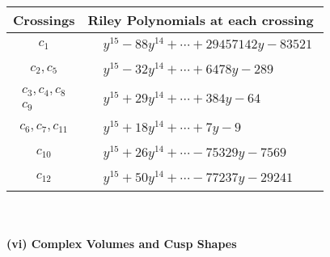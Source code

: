 \documentclass[1p]{elsarticle_modified}
\theoremstyle{definition}
\begin{document}
\begin{tabular}{m{50pt}|m{274pt}}
Crossings & \hspace{64pt}Riley Polynomials at each crossing \\
\hline $$\begin{aligned}c_{1}\end{aligned}$$&$\begin{aligned}
&y^{15}-88 y^{14}+\cdots+29457142 y-83521
\end{aligned}$\\
\hline $$\begin{aligned}c_{2},c_{5}\end{aligned}$$&$\begin{aligned}
&y^{15}-32 y^{14}+\cdots+6478 y-289
\end{aligned}$\\
\hline $$\begin{aligned}c_{3},c_{4},c_{8}\\c_{9}\end{aligned}$$&$\begin{aligned}
&y^{15}+29 y^{14}+\cdots+384 y-64
\end{aligned}$\\
\hline $$\begin{aligned}c_{6},c_{7},c_{11}\end{aligned}$$&$\begin{aligned}
&y^{15}+18 y^{14}+\cdots+7 y-9
\end{aligned}$\\
\hline $$\begin{aligned}c_{10}\end{aligned}$$&$\begin{aligned}
&y^{15}+26 y^{14}+\cdots-75329 y-7569
\end{aligned}$\\
\hline $$\begin{aligned}c_{12}\end{aligned}$$&$\begin{aligned}
&y^{15}+50 y^{14}+\cdots-77237 y-29241
\end{aligned}$\\
\hline
\end{tabular}\\~\\
\newpage\flushleft \textbf{(vi) Complex Volumes and Cusp Shapes}
\end{document}
